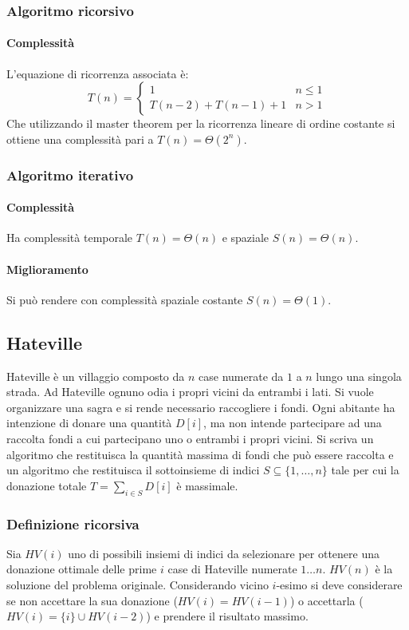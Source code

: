 		\subsubsection{Algoritmo ricorsivo}
			
			\paragraph{Complessit\`a}
			L'equazione di ricorrenza associata \`e:
			$$
			T(n)=
			\begin{cases}
			1\quad & n\le 1\\
			T(n-2) + T(n-1) + 1& n>1
			\end{cases}
			$$
			Che utilizzando il master theorem per la ricorrenza lineare di ordine costante si ottiene una complessit\`a pari a $T(n)=\Theta(2^n)$.
		\subsubsection{Algoritmo iterativo}
			
			\paragraph{Complessit\`a}
			Ha complessit\`a temporale $T(n)=\Theta(n)$ e spaziale $S(n)=\Theta(n)$.
			\paragraph{Miglioramento}
			Si pu\`o rendere con complessit\`a spaziale costante $S(n)=\Theta(1)$.
			
			
	\subsection{Hateville}
		Hateville \`e un villaggio composto da $n$ case numerate da $1$ a $n$ lungo una singola strada. Ad Hateville ognuno odia i propri vicini da entrambi i lati. Si vuole organizzare una sagra e si rende necessario
		raccogliere i fondi. Ogni abitante ha intenzione di donare una quantit\`a $D[i]$, ma non intende partecipare ad una raccolta fondi a cui partecipano uno o entrambi i propri vicini. Si scriva un algoritmo che 
		restituisca la quantit\`a massima di fondi che pu\`o essere raccolta e un algoritmo che restituisca il sottoinsieme di indici $S\subseteq\{1, \dots, n\}$ tale per cui la donazione totale $T=\sum\limits_{i\in S}D[i]$
		\`e massimale.
		\subsubsection{Definizione ricorsiva}
			Sia $HV(i)$ uno di possibili insiemi di indici da selezionare per ottenere una donazione ottimale delle prime $i$ case di Hateville numerate $1\dots n$. $HV(n)$ \`e la soluzione del problema originale. 
			Considerando vicino $i$-esimo si deve considerare se non accettare la sua donazione ($HV(i)=HV(i-1)$) o accettarla ($HV(i) = \{i\}\cup HV(i-2)$) e prendere il risultato massimo. 

